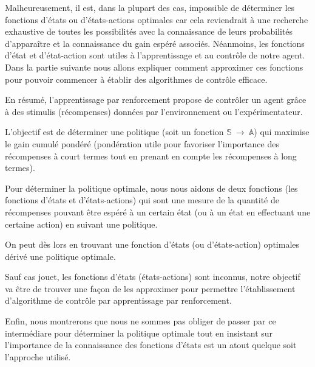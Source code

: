 Malheureusement, il est, dans la plupart des cas, impossible de déterminer les fonctions d'états ou d'états-actions optimales car cela reviendrait à une recherche exhaustive de toutes les possibilités avec la connaissance de leurs probabilités d'apparaître et la connaissance du gain espéré associés. Néanmoins, les fonctions d'état et d'état-action sont utiles à l'apprentissage et au contrôle de notre agent. Dans la partie suivante nous allons expliquer comment approximer ces fonctions pour pouvoir commencer à établir des algorithmes de contrôle efficace.

En résumé, l'apprentissage par renforcement propose de contrôler un agent grâce à des stimulis (récompenses) données par l'environnement ou l'expérimentateur. 

L'objectif est de déterminer une politique (soit un fonction $\mathbb{S} \: \rightarrow \: \mathbb{A}$) qui maximise le gain cumulé pondéré (pondération utile pour favoriser l'importance des récompenses à court termes tout en prenant en compte les récompenses à long termes).


Pour déterminer la politique optimale, nous nous aidons de deux fonctions (les fonctions d'états et d'états-actions) qui sont une mesure de la quantité de récompenses pouvant être espéré à un certain état (ou à un état en effectuant une certaine action) en suivant une politique. 

On peut dès lors en trouvant une fonction d'états (ou d'états-action) optimales dérivé une politique optimale. 

Sauf cas jouet, les fonctions d'états (états-actions) sont inconnus, notre objectif va être de trouver une façon de les approximer pour permettre l'établissement d'algorithme de contrôle par apprentissage par renforcement.


Enfin, nous montrerons que nous ne sommes pas obliger de passer par ce intermédiare pour déterminer la politique optimale tout en insistant sur l'importance de la connaissance des fonctions d'états est un atout quelque soit l'approche utilisé.
